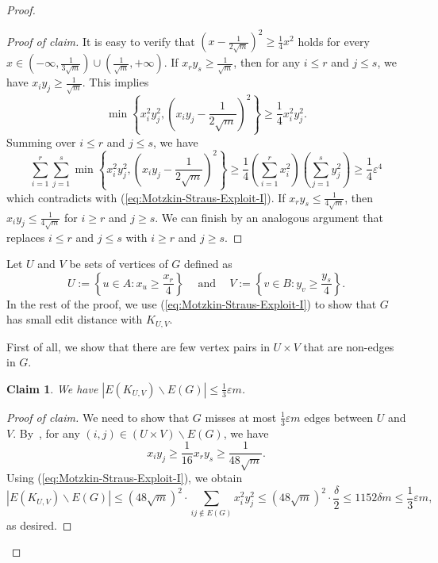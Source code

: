 \documentclass[11pt,a4paper]{article}
\newtheorem{claim}[theorem]{Claim}
\theoremstyle{definition}
\theoremstyle{remark}
\newenvironment{poc}{\begin{proof}[Proof of claim]\renewcommand*{\qedsymbol}{$\blacksquare$}}{\end{proof}}
\begin{document}
\begin{proof}
    \begin{poc}
    It is easy to verify that $(x-\frac{1}{2\sqrt{m}})^2 \ge \frac{1}{4}x^2$ holds for every $x\in (-\infty, \frac{1}{3\sqrt{m}})\cup  (\frac{1}{\sqrt{m}}, +\infty)$. 
    If $x_r y_s \ge \frac{1}{\sqrt{m}}$, then 
    for any $i \le r$ and $j \le s$, we have $x_i y_j \geq \frac{1}{\sqrt{m}}$. This implies
    $$\min\left\{ x_i^2 y_j^2, \left(x_i y_j- \frac{1}{2\sqrt{m}} \right)^2 \right\} \geq \frac{1}{4} x_i^2 y_j^2.$$
    Summing over $i\le r$ and $j\le s$, we have
    $$\sum_{i=1}^r \sum_{j=1}^s \min\left\{ x_i^2 y_j^2, \left(x_i y_j - \frac{1}{2\sqrt{m}}\right)^2 \right\} \geq \frac{1}{4} \left(\sum_{i =1}^r x_i^2 \right) \left( \sum_{j=1}^s y_j^2 \right) \geq \frac{1}{4} \varepsilon^4$$
    which contradicts with  (\ref{eq:Motzkin-Straus-Exploit-I}). If $x_r y_s \leq \frac{1}{4\sqrt{m}}$, then $x_iy_j \le \frac{1}{4\sqrt{m}}$ 
    for $i \ge r$ and $j \ge s$. 
    We can finish by an analogous argument that replaces $i \le r$ and $j \le s$ with $i \geq r$ and $j \geq s$.
    \end{poc}

     Let $U$ and $V$ be sets of vertices of $G$ defined as  
    \[ 
    U := \left\{u\in A: x_u \geq \frac{x_r}{ 4} \right\} 
    \quad~\text{and}~\quad 
    V := \left\{v \in B: y_v \geq \frac{y_s}{4} \right\}. \]
    In the rest of the proof, we use (\ref{eq:Motzkin-Straus-Exploit-I}) to show that $G$ has small edit distance with $K_{U, V}$. 
    
    First of all, we show that there are few  vertex pairs in $U \times V$ that are non-edges in $G$. 

\begin{claim}\label{cl:2}
We have $|E(K_{U, V}) \backslash E(G)| \leq \frac{1}{3} \varepsilon m $.
 \end{claim}  
  
    \begin{poc}
    We need to show that $G$ misses at most $\frac{1}{3} \varepsilon m$ edges between $U$ 
    and $V$.  By~, for any $(i, j) \in (U\times V) \backslash E(G)$, we have 
    $$x_i y_j \geq \frac{1}{16} x_r y_s  \geq  \frac{1}{48 \sqrt{m}}.$$ 
    Using (\ref{eq:Motzkin-Straus-Exploit-I}), we obtain
        $$|E(K_{U, V}) \backslash E(G)| \leq 
        (48\sqrt{m})^2 \cdot \sum_{ij \notin E(G)} x_i^2 y_j^2
        \leq 
        (48 \sqrt{m})^{2} \cdot \frac{\delta}{2} 
        \leq 1152 \delta m \leq \frac{1}{3} \varepsilon m ,$$
        as desired.
    \end{poc}


\end{proof}
\end{document}
